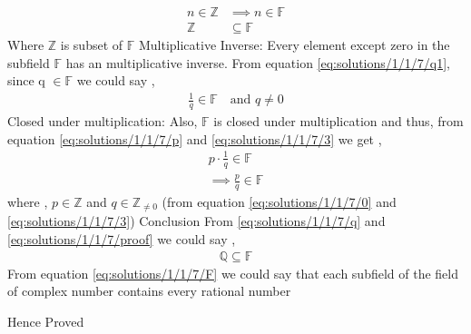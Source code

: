 \begin{align}
    n \in \mathbb{Z} &\implies n \in \mathbb{F}\\
    \mathbb{Z} &\subseteq \mathbb{F}
\end{align}
Where $\mathbb{Z}$ is subset of $\mathbb{F}$
{Multiplicative Inverse:}
Every element except zero in the subfield $\mathbb{F}$ has an multiplicative inverse. From equation \eqref{eq:solutions/1/1/7/q1}, since q $\in \mathbb{F}$ we could say ,
\begin{align}
    \frac{1}{q} \in \mathbb{F} \quad{\text{and  }} q \not= 0\label{eq:solutions/1/1/7/3}
\end{align}
{Closed under multiplication:}
Also, $\mathbb{F}$ is closed under multiplication and thus,
from equation \eqref{eq:solutions/1/1/7/p} and \eqref{eq:solutions/1/1/7/3} we get , 
\begin{align}
    p\cdot\frac{1}{q} \in \mathbb{F}\\
\implies \frac{p}{q} \in \mathbb{F}\label{eq:solutions/1/1/7/proof}
\end{align}
where , $p \in \mathbb{Z}$ and $q \in \mathbb{Z}_{\not=0}$ (from equation \eqref{eq:solutions/1/1/7/0} and \eqref{eq:solutions/1/1/7/3})
{Conclusion}
From \eqref{eq:solutions/1/1/7/q} and \eqref{eq:solutions/1/1/7/proof} we could say , 
\begin{align}
    \mathbb{Q} \subseteq \mathbb{F}\label{eq:solutions/1/1/7/F}
\end{align}
From equation \eqref{eq:solutions/1/1/7/F} we could say that each subfield of the field of complex number contains every rational number
\begin{center}
    Hence Proved
\end{center}
